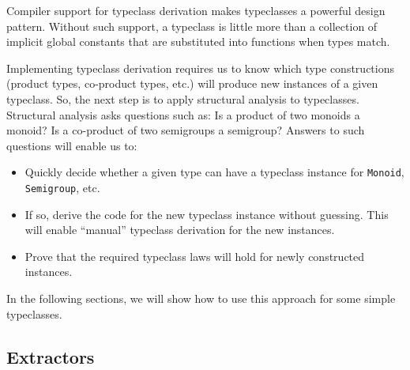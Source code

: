 Compiler support for typeclass derivation makes typeclasses a powerful
design pattern. Without such support, a typeclass is little more than
a collection of implicit global constants that are substituted into
functions when types match.

Implementing typeclass derivation requires us to know which type constructions
(product types, co-product types, etc.) will produce new instances
of a given typeclass. So, the next step is to apply 
structural analysis to typeclasses. Structural analysis asks questions
such as: Is a product of two monoids a monoid? Is a co-product of
two semigroups a semigroup? Answers to such questions will enable
us to:
\begin{itemize}
\item Quickly decide whether a given type can have a typeclass instance
for \lstinline!Monoid!, \lstinline!Semigroup!, etc.
\item If so, derive the code for the new typeclass instance without guessing.
This will enable \textsf{``}manual\textsf{''} typeclass derivation for the new instances.
\item Prove that the required typeclass laws will hold for newly constructed
instances.
\end{itemize}
In the following sections, we will show how to use this approach for
some simple typeclasses.

\subsection{Extractors\label{subsec:Extractors-typeclasses}}

